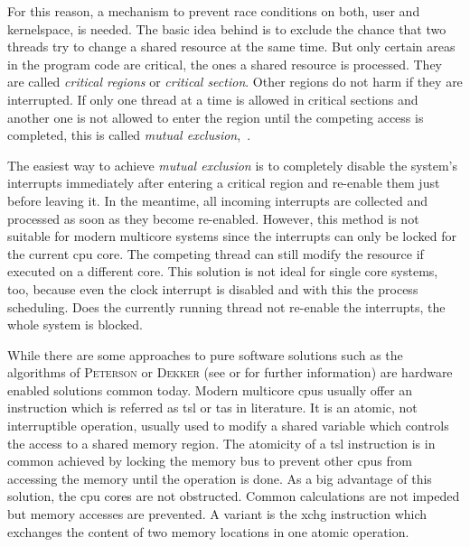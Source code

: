 For this reason, a mechanism to prevent race conditions on both, user and kernelspace, is needed.
The basic idea behind is to exclude the chance that two threads try to change a shared resource at the same time\cite{tanenbaum-modern-operating-systems}.
But only certain areas in the program code are critical, the ones a shared resource is processed.
They are called \textit{critical regions} or \textit{critical section}\cite{tanenbaum-modern-operating-systems}.
Other regions do not harm if they are interrupted.
If only one thread at a time is allowed in critical sections and another one is not allowed to enter the region until the competing access is completed, this is called \textit{mutual exclusion}\cite{tanenbaum-modern-operating-systems},~\cite{glatz2015betriebssysteme}.

The easiest way to achieve \textit{mutual exclusion} is to completely disable the system's interrupts immediately after entering a critical region and re-enable them just before leaving it.
In the meantime, all incoming interrupts are collected and processed as soon as they become re-enabled\cite{achilles2006betriebssysteme}.
However, this method is not suitable for modern multicore systems since the interrupts can only be locked for the current \ac{cpu} core.
The competing thread can still modify the resource if executed on a different core.
This solution is not ideal for single core systems, too, because even the clock interrupt is disabled and with this the process scheduling.
Does the currently running thread not re-enable the interrupts, the whole system is blocked\cite{tanenbaum-modern-operating-systems}.

While there are some approaches to pure software solutions such as the algorithms of \textsc{Peterson} or \textsc{Dekker} (see \cite{tanenbaum-modern-operating-systems} or \cite{silberschatz2009operating} for further information) are hardware enabled solutions common today\cite{tanenbaum-modern-operating-systems}.
Modern multicore \acp{cpu} usually offer an instruction which is referred as \ac{tsl} or \ac{tas} in literature.
It is an atomic, not interruptible operation, usually used to modify a shared variable which controls the access to a shared memory region\cite{tanenbaum-modern-operating-systems}.
The atomicity of a \ac{tsl} instruction is in common achieved by locking the memory bus to prevent other \acp{cpu} from accessing the memory until the operation is done.
As a big advantage of this solution, the \ac{cpu} cores are not obstructed.
Common calculations are not impeded but memory accesses are prevented\cite{tanenbaum-modern-operating-systems}.
A variant is the \ac{xchg} instruction which exchanges the content of two memory locations in one atomic operation\cite{silberschatz2009operating}.

